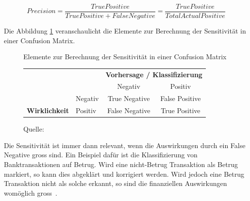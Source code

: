 $$Precision = \frac{True Positive}{True Positive + False Negative} = \frac{True Positive}{Total Actual Positive}$$
\vspace*{0.2cm}

Die Abbildung \ref{cm-recall} veranschaulicht die Elemente zur Berechnung der Sensitivität in einer Confusion Matrix.

\begin{figure}[h!]
    \centering
    \captionsetup{width=.9\linewidth}
    \caption{Elemente zur Berechnung der Sensitivität in einer Confusion Matrix}
    \def\arraystretch{1.5}
    \begin{tabular}{llcc}
        \multicolumn{2}{l}{}                                                                                                & \multicolumn{2}{c}{\textbf{Vorhersage / Klassifizierung}}                                                                \\ \cline{3-4} 
        \multicolumn{1}{c}{\textbf{}}                                & \multicolumn{1}{l|}{}                                & \multicolumn{1}{c|}{Negativ}                                & \multicolumn{1}{c|}{Positiv}                               \\ \cline{2-4} 
        \multicolumn{1}{l|}{}                                        & \multicolumn{1}{l|}{Negativ}                         & \multicolumn{1}{c|}{True Negative}                          & \multicolumn{1}{c|}{False Positive}                        \\ \cline{2-4} 
        \multicolumn{1}{l|}{\multirow{-2}{*}{\textbf{Wirklichkeit}}} & \multicolumn{1}{l|}{\cellcolor[HTML]{B5D0EE}Positiv} & \multicolumn{1}{c|}{\cellcolor[HTML]{B5D0EE}False Negative} & \multicolumn{1}{c|}{\cellcolor[HTML]{B5D0EE}True Positive} \\ \cline{2-4} 
    \end{tabular}
    \vspace*{0.3cm}
    \caption*{Quelle: \textcite{TDSAccuracy}}
    \label{cm-recall}
\end{figure}

Die Sensitivität ist immer dann relevant, wenn die Auswirkungen durch ein False Negative gross sind. Ein Beispiel dafür ist die Klassifizierung von Banktransaktionen auf Betrug. Wird eine nicht-Betrug Transaktion als Betrug markiert, so kann dies abgeklärt und korrigiert werden. Wird jedoch eine Betrug Transaktion nicht als solche erkannt, so sind die finanziellen Auswirkungen womöglich gross~\autocite{TDSAccuracy}.

